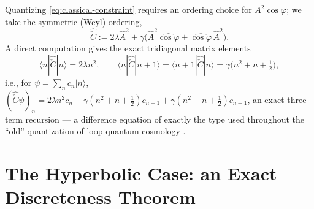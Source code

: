 \documentclass[11pt]{amsart}
\theoremstyle{remark}
\begin{document}
Quantizing \eqref{eq:classical-constraint} requires an ordering choice for $A^2\cos\varphi$; we take the symmetric (Weyl) ordering,
\begin{equation}\label{eq:quantum-constraint}
\hat{\check C} := 2\lambda\hat A^2 + \gamma\big(\hat A^2\widehat{\cos\varphi}+\widehat{\cos\varphi}\,\hat A^2\big).
\end{equation}
A direct computation gives the exact tridiagonal matrix elements
\begin{equation}\label{eq:matrix-elements}
\langle n|\hat{\check C}|n\rangle = 2\lambda n^2,\qquad \langle n|\hat{\check C}|n{+}1\rangle=\langle n{+}1|\hat{\check C}|n\rangle = \gamma\Big(n^2+n+\tfrac12\Big),
\end{equation}
i.e., for $\psi=\sum_nc_n|n\rangle$, $(\hat{\check C}\psi)_n = 2\lambda n^2c_n+\gamma(n^2{+}n{+}\tfrac12)c_{n+1}+\gamma(n^2{-}n{+}\tfrac12)c_{n-1}$, an exact three-term recursion --- a difference equation of exactly the type used throughout the ``old'' quantization of loop quantum cosmology \cite{ANovel}.

\section{The Hyperbolic Case: an Exact Discreteness Theorem}
\end{document}
